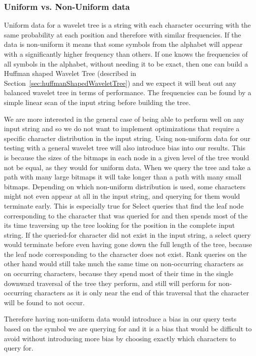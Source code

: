 \subsubsection{Uniform vs. Non-Uniform data}
\label{sec:expnotesUniformVsNonuniform}
Uniform data for a wavelet tree is a string with each character occurring with the same probability at each position and therefore with similar frequencies.
If the data is non-uniform it means that some symbols from the alphabet will appear with a significantly higher frequency than others.
If one knows the frequencies of all symbols in the alphabet, without needing it to be exact, then one can build a Huffman shaped Wavelet Tree (described in Section~\ref{sec:huffmanShapedWaveletTree}) and we expect it will beat out any balanced wavelet tree in terms of performance.
The frequencies can be found by a simple linear scan of the input string before building the tree.

We are more interested in the general case of being able to perform well on any input string and so we do not want to implement optimizations that require a specific character distribution in the input string.
Using non-uniform data for our testing with a general wavelet tree will also introduce bias into our results.
This is because the sizes of the bitmaps in each node in a given level of the tree would not be equal, as they would for uniform data.
When we query the tree and take a path with many large bitmaps it will take longer than a path with many small bitmaps.
Depending on which non-uniform distribution is used, some characters might not even appear at all in the input string, and querying for them would terminate early.
This is especially true for Select queries that find the leaf node corresponding to the character that was queried for and then spends most of the its time traversing up the tree looking for the position in the complete input string.
If the queried-for character did not exist in the input string, a select query would terminate before even having gone down the full length of the tree, because the leaf node corresponding to the character does not exist.
Rank queries on the other hand would still take much the same time on non-occurring characters as on occurring characters, because they spend most of their time in the single downward traversal of the tree they perform, and still will perform for non-occurring characters as it is only near the end of this traversal that the character will be found to not occur.

Therefore having non-uniform data would introduce a bias in our query tests based on the symbol we are querying for and it is a bias that would be difficult to avoid without introducing more bias by choosing exactly which characters to query for.

